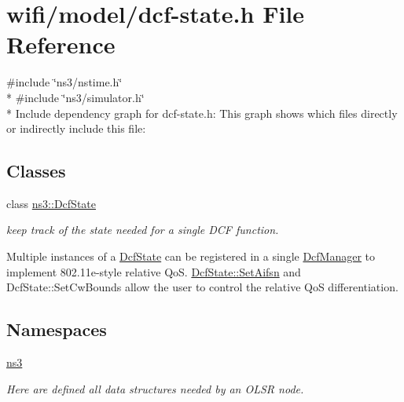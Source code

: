 \hypertarget{dcf-state_8h}{}\section{wifi/model/dcf-\/state.h File Reference}
\label{dcf-state_8h}
{\ttfamily \#include \char`\"{}ns3/nstime.\+h\char`\"{}}\\*
{\ttfamily \#include \char`\"{}ns3/simulator.\+h\char`\"{}}\\*
Include dependency graph for dcf-\/state.h\+:
This graph shows which files directly or indirectly include this file\+:
\subsection*{Classes}
\begin{DoxyCompactItemize}
\item 
class \hyperlink{classns3_1_1DcfState}{ns3\+::\+Dcf\+State}
\begin{DoxyCompactList}\small\item\em keep track of the state needed for a single D\+CF function.

Multiple instances of a \hyperlink{classns3_1_1DcfState}{Dcf\+State} can be registered in a single \hyperlink{classns3_1_1DcfManager}{Dcf\+Manager} to implement 802.\+11e-\/style relative QoS. \hyperlink{classns3_1_1DcfState_ae957a4ab4e518d5efd50bb8640dd07c5}{Dcf\+State\+::\+Set\+Aifsn} and Dcf\+State\+::\+Set\+Cw\+Bounds allow the user to control the relative QoS differentiation. \end{DoxyCompactList}\end{DoxyCompactItemize}
\subsection*{Namespaces}
\begin{DoxyCompactItemize}
\item 
 \hyperlink{namespacens3}{ns3}
\begin{DoxyCompactList}\small\item\em Here are defined all data structures needed by an O\+L\+SR node. \end{DoxyCompactList}\end{DoxyCompactItemize}
